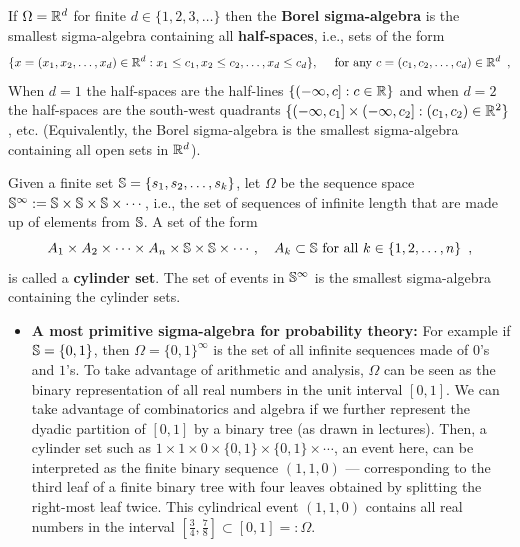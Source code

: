 \item
If $\Omega = \mathbb{R}^d$ for finite $d \in \{1,2,3,\ldots\}$ then the {\bf Borel sigma-algebra} is the smallest sigma-algebra containing 
all {\bf half-spaces}, i.e., sets of the form 
$$\{x=(x_1,x_2,\ldots,x_d) \in \mathbb{R}^d: x_1 \leq c_1, x_2 \leq c_2, \ldots, x_d \leq c_d\}, \quad \text{ for any } c=(c_1,c_2,\ldots,c_d)\in\mathbb{R}^d \enspace ,
$$
When $d=1$ the half-spaces are the half-lines $\{(-\infty,c]: c \in \mathbb{R}\}$ and when $d=2$ the half-spaces are the south-west quadrants $\{(-\infty,c_1]\times(-\infty,c_2] : (c_1,c_2) \in \mathbb{R}^2\}$, etc.  
(Equivalently, the Borel sigma-algebra is the smallest sigma-algebra containing all open sets in $\mathbb{R}^d$). 

\item
Given a finite set $\mathbb{S}=\{s_1,s_2,\ldots,s_k\}$, let $\Omega$ be the sequence space $\mathbb{S}^{\infty}:=\mathbb{S} \times \mathbb{S} \times \mathbb{S} \times\cdots$, i.e., the set of sequences of infinite length that are made up of elements from $\mathbb{S}$.  
A set of the form
\[
A_1 \times A_2 \times \cdots \times A_n \times \mathbb{S} \times \mathbb{S} \times \cdots, \quad A_k \subset \mathbb{S} \text{ for all } k \in \{1,2,\ldots,n\} \enspace ,
\]
is called a {\bf cylinder set}.  
The set of events in $\mathbb{S}^{\infty}$ is the smallest sigma-algebra containing the cylinder sets. 

\begin{itemize}
\item {\bf A most primitive sigma-algebra for probability theory:} 
For example if $\mathbb{S}=\{0,1\}$, then $\Omega = \{0,1\}^{\infty}$ is the set of all infinite sequences made of $0$'s and $1$'s. 
To take advantage of arithmetic and analysis, $\Omega$ can be seen as the binary representation of all real numbers in the unit interval $[0,1]$.  
We can take advantage of combinatorics and algebra if we further represent the dyadic partition of $[0,1]$ by a binary tree (as drawn in lectures). 
Then, a cylinder set such as $1 \times 1 \times 0 \times \{0,1\} \times \{0,1\} \times \cdots$, an event here, can be interpreted as the finite binary sequence $(1,1,0)$ --- corresponding to the third leaf of a finite binary tree with four leaves obtained by splitting the right-most leaf twice. This cylindrical event $(1,1,0)$ contains all real numbers in the interval $[\frac{3}{4},\frac{7}{8}] \subset [0,1] =: \Omega$.\end{itemize}

